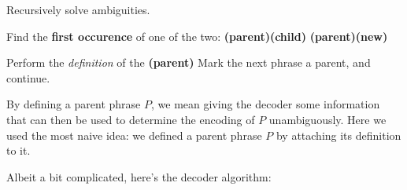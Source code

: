 \documentclass[scrartcl]{article}
\begin{document}
\begin{algorithm}
    \caption{ Recursively solve ambiguities. }\label{riffle}
    \begin{algorithmic}[1]
        \State Find the \textbf{first occurence} of one of the two:
        \Indent
            \State \textbf{(parent)(child)}
            \State \textbf{(parent)(new)}
        \EndIndent

        \State Perform the \textit{definition} of the \textbf{(parent)}
        \State Mark the next phrase a parent, and continue.
        \EndWhile
    \EndProcedure
    \end{algorithmic}
\end{algorithm}
\begin{proposition*}
    By defining a parent phrase $P$, we mean giving the decoder some information that can then be used to determine the encoding 
    of $P$ unambiguously. Here we used the most naive idea: we defined a parent phrase $P$ by attaching its definition to it.
\end{proposition*}
\newpage
Albeit a bit complicated, here's the decoder algorithm:
\end{document}

